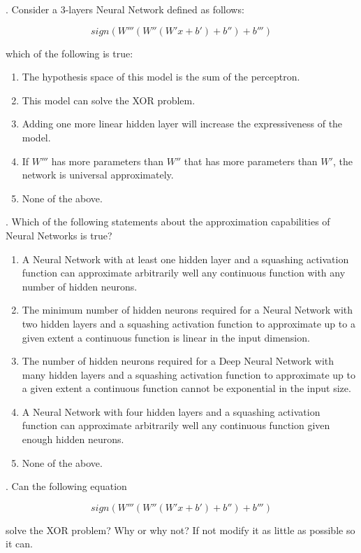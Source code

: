 . Consider a 3-layers Neural Network defined as follows:

$$ sign (W'''(W''(W'x + b') + b'') + b''')$$

which of the following is true:

\begin{enumerate}[label=\roman*]
    \item The hypothesis space of this model is the sum of the perceptron.
    \item This model can solve the XOR problem.
    \item Adding one more linear hidden layer will increase the expressiveness of the model.
    \item If $W'''$ has more parameters than $W''$ that has more parameters than $W'$, the network is universal approximately. 
    \item None of the above.
\end{enumerate}

. Which of the following statements about the approximation capabilities of Neural Networks is true? 

\begin{enumerate}[label=\roman*]
    \item A Neural Network with at least one hidden layer and a squashing activation function can approximate arbitrarily well any continuous function with any number of hidden neurons.
    \item The minimum number of hidden neurons required for a Neural Network with two hidden layers and a squashing activation function to approximate up to a given extent a continuous function is linear in the input dimension.
    \item The number of hidden neurons required for a Deep Neural Network with many hidden layers and a squashing activation function to approximate up to a given extent a continuous function cannot be exponential in the input size.
    \item A Neural Network with four hidden layers and a squashing activation function can approximate arbitrarily well any continuous function given enough hidden neurons. 
    \item None of the above.
\end{enumerate}


. Can the following equation

$$ sign (W'''(W''(W'x + b') + b'') + b''')$$

solve the XOR problem? Why or why not? If not modify it as little as possible so it can.

